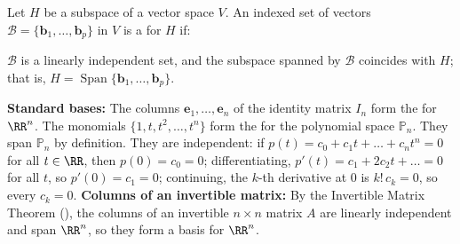 \documentclass[10pt]{scrartcl}
\newcommand{\vv}[1]{\mathbf{#1}}
\DeclareMathOperator{\spn}{Span}\DeclareMathOperator{\Nul}{Nul}\DeclareMathOperator{\Col}{Col}\DeclareMathOperator{\Row}{Row}\DeclareMathOperator{\nullity}{nullity}
\begin{document}
\begin{definition*}
  Let $H$ be a subspace of a vector space $V$. An indexed set of vectors $\mathcal{B}=\{\vv b_1,\dots,\vv b_p\}$ in $V$ is a  for $H$ if:
  \begin{enumerate}[(i)]
    \ii $\mathcal{B}$ is a linearly independent set, and
    \ii the subspace spanned by $\mathcal{B}$ coincides with $H$; that is, $H=\spn\{\vv b_1,\dots,\vv b_p\}$.
  \end{enumerate}
  \begin{itemize}
    \ii \textbf{Standard bases:} The columns $\vv e_1,\dots,\vv e_n$ of the identity matrix $I_n$ form the  for $\RR^n$. The monomials $\{1,t,t^2,\dots,t^n\}$ form the  for the polynomial space $\mathbb{P}_n$. They span $\mathbb{P}_n$ by definition. They are independent: if $p(t)=c_0+c_1t+\dots+c_nt^n=0$ for all $t\in\RR$, then $p(0)=c_0=0$; differentiating, $p'(t)=c_1+2c_2t+\dots=0$ for all $t$, so $p'(0)=c_1=0$; continuing, the $k$-th derivative at $0$ is $k!\,c_k=0$, so every $c_k=0$.
    \ii \textbf{Columns of an invertible matrix:} By the Invertible Matrix Theorem (), the columns of an invertible $n\times n$ matrix $A$ are linearly independent and span $\RR^n$, so they form a basis for $\RR^n$.
  \end{itemize}
\end{definition*}
\end{document}
